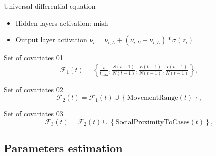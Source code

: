 \begin{frame}[allowframebreaks]{Universal differential equation}
    \begin{itemize}
        \item Hidden layers activation: mish \cite{misraMishSelfRegularized2020}
        \item Output layer activation $\nu_i = \nu_{i,L} + (\nu_{i,U} - \nu_{i,L}) * \sigma (z_i)$
    \end{itemize}

    \framebreak

    \begin{block}{Set of covariates 01}
        \begin{equation*}
            \begin{aligned}
                \mathcal{F}_1(t) = \left\lbrace \frac{t}{t_\text{max}}, \frac{S(t-1)}{N(t-1)}, \frac{E(t-1)}{N(t-1)}, \frac{I(t-1)}{N(t-1)} \right\rbrace,
            \end{aligned}
        \end{equation*}
    \end{block}

    \begin{block}{Set of covariates 02}
        \begin{equation*}
            \mathcal{F}_2(t) = \mathcal{F}_1(t) \cup \left\lbrace \text{MovementRange}(t) \right\rbrace,
        \end{equation*}
    \end{block}

    \begin{block}{Set of covariates 03}
        \begin{equation*}
            \mathcal{F}_3(t) = \mathcal{F}_2(t) \cup \left\lbrace \text{SocialProximityToCases}(t) \right\rbrace,
        \end{equation*}
    \end{block}

\end{frame}

\subsection{Parameters estimation}

